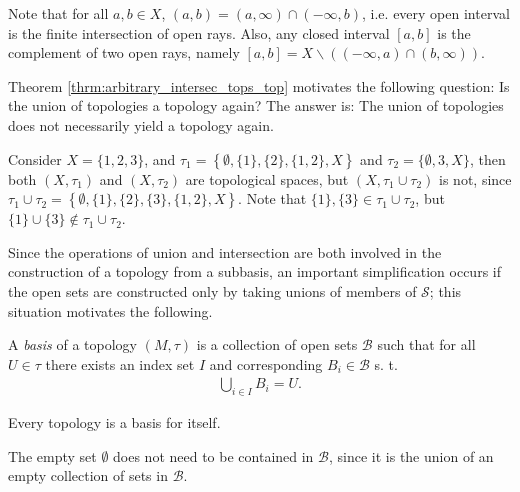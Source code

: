 \begin{remark}\label{remark:open_intervals_union_open_rays}
	Note that for all $a, b\in X$, $(a, b) = (a, \infty) \cap (-\infty, b)$, i.e. every open interval is the finite intersection of open rays. Also, any closed interval $[a, b]$ is the complement of two open rays, namely $[a, b] = X \backslash \left((-\infty, a) \cap (b, \infty)\right)$.
\end{remark}

\begin{remark}
	Theorem \ref{thrm:arbitrary_intersec_tops_top} motivates the following question: Is the union of topologies a topology again? The answer is: The union of topologies does not necessarily yield a topology again.
\end{remark}

\begin{exmp}
	Consider $X = \{1, 2, 3\}$, and $\tau_1 = \left\{\emptyset, \{1\}, \{2\}, \{1, 2\}, X\right\}$ and $\tau_2=\{\emptyset, {3}, X\}$, then both $(X, \tau_1)$ and $(X, \tau_2)$ are topological spaces, but $(X, \tau_1\cup\tau_2)$ is not, since $\tau_1\cup \tau_2 = \left\{ \emptyset, \{1\}, \{2\}, \{3\}, \{1, 2\}, X \right\}$. Note that $\{1\}, \{3\}\in \tau_1\cup \tau_2$, but $\{1\}\cup \{3\}\notin \tau_1\cup\tau_2$.
\end{exmp}

Since the operations of union and intersection are both involved in the construction of a topology from a subbasis, an important simplification occurs if the open sets are constructed only by taking unions of members of $\mathscr S$; this situation motivates the following.

\begin{defn}[Basis]
	A \textit{basis} of a topology $\left(M, \tau\right)$ is a collection of open sets $\mathcal B$ such that for all $U\in \tau$ there exists an index set $I$ and corresponding $B_i\in \mathcal B$ s. t. 
	\begin{align}
		\bigcup_{i\in I}B_i = U. 
	\end{align}
\end{defn}

\begin{exmp}
	Every topology is a basis for itself.
\end{exmp}

\begin{remark}
	The empty set $\emptyset$ does not need to be contained in $\mathscr B$, since it is the union of an empty collection of sets in $\mathscr B$.
\end{remark}

